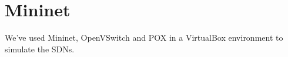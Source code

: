 \chapter{Mininet}

We've used Mininet, OpenVSwitch and POX in a VirtualBox environment to
simulate the \acp{SDN}.
